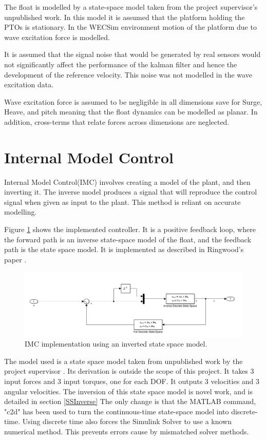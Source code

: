 \documentclass{report}
\begin{document}
The float is modelled by a state-space model taken from the project supervisor's unpublished work\cite{andyMPC}. In this model it is assumed that the platform holding the PTOs is stationary. In the WECSim environment motion of the platform due to wave excitation force is modelled.

It is assumed that the signal noise that would be generated by real sensors would not significantly affect the performance of the kalman filter and hence the development of the reference velocity. This noise was not modelled in the wave excitation data.

Wave excitation force is assumed to be negligible in all dimensions save for Surge, Heave, and pitch meaning that the float dynamics can be modelled as planar. In addition, cross-terms that relate forces across dimensions are neglected.

\section{Internal Model Control}
Internal Model Control(IMC) involves creating a model of the plant, and then inverting it. The inverse model produces a  signal that will reproduce the control signal when given as input to the plant. This method is reliant on accurate modelling.

Figure \ref{fig:IMC} shows the implemented controller. It is a positive feedback loop, where the forward path is an inverse state-space model of the float, and the feedback path is the state space model. It is implemented as described in Ringwood's paper \cite{ringwood}.

\begin{figure}
\centering
\hspace{-1cm}
\includegraphics[scale=0.5]{graphics/IMC}
\caption{IMC implementation using an inverted state space model.}
\label{fig:IMC}
\end{figure}

The model used is a state space model taken from unpublished work by the project supervisor \cite{andyMPC}. Its derivation is outside the scope of this project. It takes 3 input forces and 3 input torques, one for each DOF. It outputs 3 velocities and 3 angular velocities. The inversion of this state space model is novel work, and is detailed in section \ref{SSInverse} The only change is that the MATLAB command, "c2d" has been used to turn the continuous-time state-space model into discrete-time. Using discrete time also forces the Simulink Solver to use a known numerical method. This prevents errors cause by mismatched solver methods.
\end{document}
